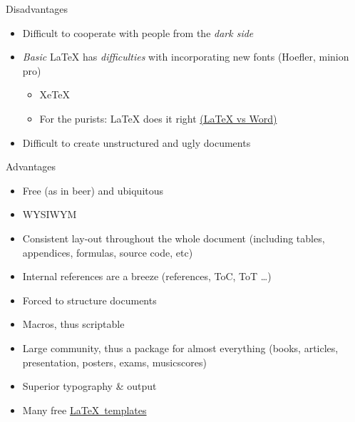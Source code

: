 \documentclass[ignorenonframetext]{beamer}
\begin{document}
{\begin{frame}{Disadvantages}
\begin{itemize}
  \begin{itemize}
  \item
    Learning curve, but
  \item
    hurray for
    \href{https://wch.github.io/latexsheet/latexsheet.pdf}{cheat sheets}
    and Google
  \end{itemize}
\item
  Difficult to cooperate with people from the \emph{dark side}
\item
  \emph{Basic} \LaTeX{} has \emph{difficulties} with incorporating new
  fonts (Hoefler, minion pro)

  \begin{itemize}
  \item
    XeTeX  \item
    For the purists: \LaTeX{} does it right
    \href{http://oestrem.com/thingstwice/2007/05/latex-vs-word-vs-writer/}{(\LaTeX{}
    vs Word)}
  \end{itemize}
  \item Difficult to create unstructured and ugly documents
\end{itemize}

\end{frame}

\begin{frame}{Advantages}

\begin{itemize}
\item
  Free (as in beer) and ubiquitous
\item
  WYSIWYM
\item
  Consistent lay-out throughout the whole document (including tables,
  appendices, formulas, source code, etc)
\item
  Internal references are a breeze (references, ToC, ToT \ldots{})
\item
  Forced to structure documents
\item
  Macros, thus scriptable
\item
  Large community, thus a package for almost everything (books,
  articles, presentation, posters, exams, musicscores)
\item
  Superior typography \& output
\item
  Many free \href{https://www.overleaf.com/latex/templates/}{\LaTeX~templates}
\end{itemize}

\end{frame}

}
\end{document}
